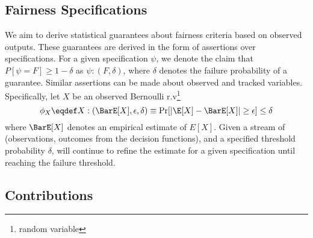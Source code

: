 \subsection{Fairness Specifications}
We aim to derive statistical guarantees about fairness criteria based on observed outputs. 
These guarantees are derived in the form of assertions over specifications.
For a given specification $\psi$, we denote the claim that $P[\psi = F] \geq 1 - \delta$ as $\psi: (F, \delta)$, where $\delta$ denotes the failure probability of a guarantee. 
Similar assertions can be made about observed and tracked variables. 
Specifically, let $X$ be an observed Bernoulli r.v\footnote{random variable}
\begin{equation}\label{eqn:eps-delta-defn}
  \phi_X \eqdef X: (\BarE[X], \epsilon, \delta) \equiv \Pr[|\E[X] - \BarE[X]| \geq \epsilon] \leq \delta  
\end{equation}
where $\BarE[X]$ denotes an empirical estimate of $E[X]$.
Given a stream of (observations, outcomes from the decision functions), and a specified threshold probability $\delta$, \AVOIRmethodname{} will continue to refine the estimate for a given specification until reaching the failure threshold.

\subsection{Contributions}


\begin{comment}
\subsubsection{Improved Grammar}
Suppose $r$ is the return value of a decision function \texttt{f} that takes features \texttt{x} and minority class indicator \texttt{s} as input, the Python expression for the first half of the 80\%-rule as defined by \citet{albarghouthi2019fairness} would be

\begin{lstlisting}[columns=flexible, language=Python]
@spec( (E(r&(s=1))/E(s=1)) * (E(s=0)/E(r&(s=0)) ) >= 0.8)
\end{lstlisting}

Our improved grammar introduces the \texttt{given} keyword that helps simplify this expression.
In our grammar, this specification would be expressed as
\begin{lstlisting}[columns=flexible, language=Python]
@spec( E(r,given=(s=1)) / E(r,given=(s=0)) >= 0.8) 
\end{lstlisting}
\end{comment}



